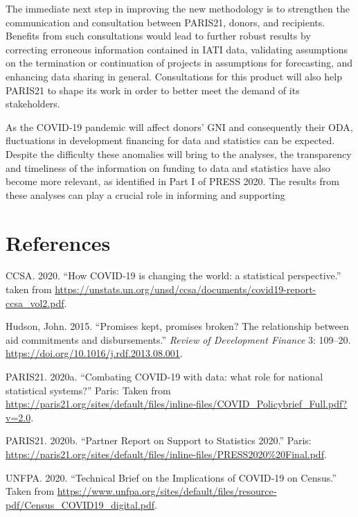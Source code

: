 \documentclass[
]{article}
\newlength{\cslhangindent}
\newlength{\cslentryspacingunit} %
\newenvironment{CSLReferences}[2] %
 {%
  \setlength{\parindent}{0pt}
  \ifodd #1
  \let\oldpar\par
  \def\par{\hangindent=\cslhangindent\oldpar}
  \fi
  \setlength{\parskip}{#2\cslentryspacingunit}
 }%
 {}
\begin{document}
The immediate next step in improving the new methodology is to strengthen the communication and
consultation between PARIS21, donors, and recipients. Benefits from such consultations would lead
to further robust results by correcting erroneous information contained in IATI data, validating
assumptions on the termination or continuation of projects in assumptions for forecasting, and
enhancing data sharing in general. Consultations for this product will also help PARIS21 to shape its
work in order to better meet the demand of its stakeholders.

As the COVID‐19 pandemic will affect donors' GNI and consequently their ODA, fluctuations in
development financing for data and statistics can be expected. Despite the difficulty these anomalies
will bring to the analyses, the transparency and timeliness of the information on funding to data and
statistics have also become more relevant, as identified in Part I of PRESS 2020. The results from these
analyses can play a crucial role in informing and supporting

\hypertarget{references}{%
\section*{References}\label{references}}

\hypertarget{refs}{}
\begin{CSLReferences}{1}{0}
\leavevmode{}%
CCSA. 2020. {``{How COVID‐19 is changing the world: a statistical perspective}.''} taken from \url{https://unstats.un.org/unsd/ccsa/documents/covid19-report-ccsa_vol2.pdf}.

\leavevmode{}%
Hudson, John. 2015. {``{Promises kept, promises broken? The relationship between aid commitments and disbursements}.''} \emph{Review of Development Finance} 3: 109--20. \url{https://doi.org/10.1016/j.rdf.2013.08.001}.

\leavevmode{}%
PARIS21. 2020a. {``{Combating COVID‐19 with data: what role for national statistical systems?}''} Paris: Taken from \url{https://paris21.org/sites/default/files/inline‐files/COVID_Policybrief_Full.pdf?v=2.0}.

\leavevmode{}%
PARIS21. 2020b. {``{Partner Report on Support to Statistics 2020}.''} Paris: \url{https://paris21.org/sites/default/files/inline-files/PRESS2020\%20Final.pdf}.

\leavevmode{}%
UNFPA. 2020. {``{Technical Brief on the Implications of COVID‐19 on Census}.''} Taken from \url{https://www.unfpa.org/sites/default/files/resource‐pdf/Census_COVID19_digital.pdf}.

\end{CSLReferences}
\end{document}
